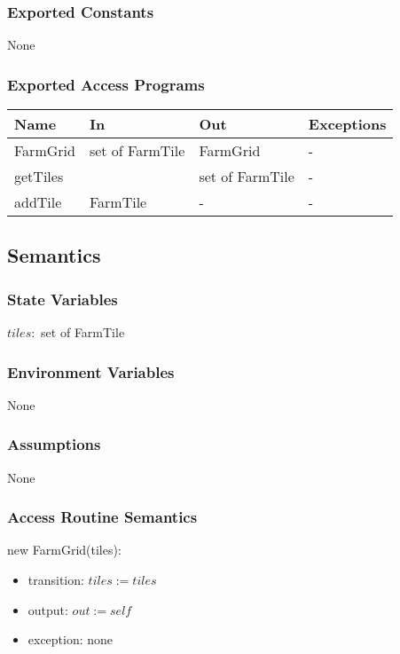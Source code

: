 \documentclass[12pt, titlepage]{article}
\begin{document}
\subsubsection{Exported Constants}

None

\subsubsection{Exported Access Programs}

\begin{center}
\begin{tabular}{p{2cm} p{4cm} p{4cm} p{2cm}}
\hline
\textbf{Name} & \textbf{In} & \textbf{Out} & \textbf{Exceptions} \\
\hline
FarmGrid & set of FarmTile & FarmGrid & - \\
\hline
getTiles & & set of FarmTile & - \\
\hline
addTile & FarmTile & - & - \\
\hline
\end{tabular}
\end{center}

\subsection{Semantics}

\subsubsection{State Variables}

$tiles :$ set of FarmTile

\subsubsection{Environment Variables}

None

\subsubsection{Assumptions}

None

\subsubsection{Access Routine Semantics}

\noindent new FarmGrid(tiles):
\begin{itemize}
\item transition: $tiles := tiles$
\item output: $out := self$
\item exception: none
\end{itemize}
\end{document}
